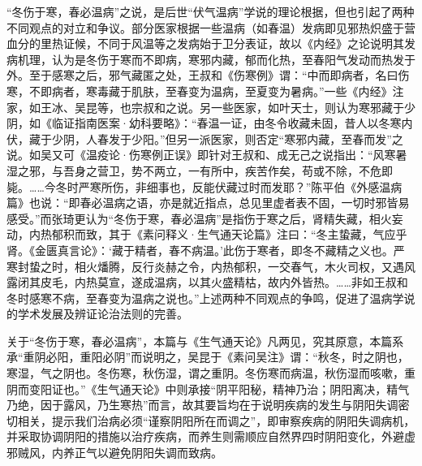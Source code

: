 \documentclass[12pt]{ctexbook}
\begin{document}
“冬伤于寒，春必温病”之说，是后世“伏气温病”学说的理论根据，但也引起了两种不同观点的对立和争议。部分医家根据一些温病（如春温）发病即见邪热炽盛于营血分的里热证候，不同于风温等之发病始于卫分表证，故以《内经》之论说明其发病机理，认为是冬伤于寒而不即病，寒邪内藏，郁而化热，至春阳气发动而热发于外。至于感寒之后，邪气藏匿之处，王叔和《伤寒例》谓：“中而即病者，名曰伤寒，不即病者，寒毒藏于肌肤，至春变为温病，至夏变为暑病。”一些《内经》注家，如王冰、吴昆等，也宗叔和之说。另一些医家，如叶天士，则认为寒邪藏于少阴，如《临证指南医案·幼科要略》：“春温一证，由冬令收藏未固，昔人以冬寒内伏，藏于少阴，人春发于少阳。”但另一派医家，则否定“寒邪内藏，至春而发”之说。如吴又可《温疫论·伤寒例正误》即针对王叔和、成无己之说指出：“风寒暑湿之邪，与吾身之营卫，势不两立，一有所中，疾苦作矣，苟或不除，不危即毙。……今冬时严寒所伤，非细事也，反能伏藏过时而发耶？”陈平伯《外感温病篇》也说：“即春必温病之语，亦是就近指点，总见里虚者表不固，一切时邪皆易感受。”而张琦更认为“冬伤于寒，春必温病”是指伤于寒之后，肾精失藏，相火妄动，内热郁积而致，其于《素问释义·生气通天论篇》注曰：“冬主蛰藏，气应乎肾。《金匮真言论》：‘藏于精者，春不病温。’此伤于寒者，即冬不藏精之义也。严寒封蛰之时，相火燔腾，反行炎赫之令，内热郁积，一交春气，木火司权，又遇风露闭其皮毛，内热莫宣，遂成温病，以其火盛精枯，故内外皆热。……非如王叔和冬时感寒不病，至春变为温病之说也。”上述两种不同观点的争鸣，促进了温病学说的学术发展及辨证论治法则的完善。

关于“冬伤于寒，春必温病”，本篇与《生气通天论》凡两见，究其原意，本篇系承“重阴必阳，重阳必阴”而说明之，吴昆于《素问吴注》谓：“秋冬，时之阴也，寒湿，气之阴也。冬伤寒，秋伤湿，谓之重阴。冬伤寒而病温，秋伤湿而咳嗽，重阴而变阳证也。”《生气通天论》中则承接“阴平阳秘，精神乃治；阴阳离决，精气乃绝，因于露风，乃生寒热”而言，故其要旨均在于说明疾病的发生与阴阳失调密切相关，提示我们治病必须“谨察阴阳所在而调之”，即审察疾病的阴阳失调病机，并采取协调阴阳的措施以治疗疾病，而养生则需顺应自然界四时阴阳变化，外避虚邪贼风，内养正气以避免阴阳失调而致病。

\end{document}
